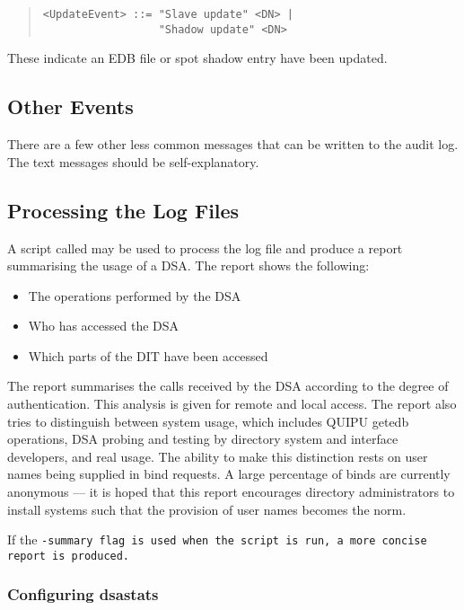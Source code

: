 \begin{quote}\begin{verbatim}
<UpdateEvent> ::= "Slave update" <DN> |
                  "Shadow update" <DN> 
\end{verbatim}\end{quote}

These indicate an EDB file or spot shadow entry have been updated.

\subsection{Other Events}

There are a few other less common messages that can 
be written to the audit log. The text
messages should be self-explanatory.

\subsection{Processing the Log Files}

A script called  may be used to process the log file and
produce a report summarising the usage of a DSA.  The report shows the
following:

\begin{itemize}
\item
The operations performed by the DSA 
\item
Who has accessed the DSA
\item
Which parts of the DIT have been accessed
\end{itemize}

The report summarises the calls received by the DSA according to the degree of
authentication.  This analysis is given for remote and local access.
The report also tries to distinguish between system usage, which includes
QUIPU getedb operations, DSA probing and testing by directory system and
interface developers, and real usage.  The ability to make this
distinction rests on user
names being supplied in bind requests.  A large percentage of binds are
currently anonymous --- it is hoped that this report encourages directory
administrators to install systems such that the provision of user names
becomes the norm.

If the \tt -summary\rm \ flag is used when the script is run, a more concise report
is produced.

\subsubsection{Configuring dsastats}

